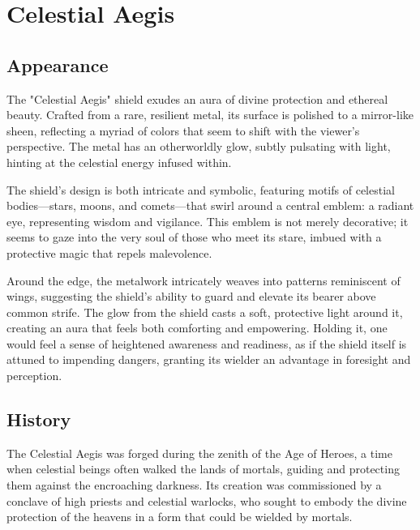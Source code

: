 
\chapter*{Celestial Aegis}

\section*{Appearance}
The "Celestial Aegis" shield exudes an aura of divine protection and ethereal beauty. Crafted from a rare, resilient metal, its surface is polished to a mirror-like sheen, reflecting a myriad of colors that seem to shift with the viewer's perspective. The metal has an otherworldly glow, subtly pulsating with light, hinting at the celestial energy infused within.

The shield's design is both intricate and symbolic, featuring motifs of celestial bodies—stars, moons, and comets—that swirl around a central emblem: a radiant eye, representing wisdom and vigilance. This emblem is not merely decorative; it seems to gaze into the very soul of those who meet its stare, imbued with a protective magic that repels malevolence.

Around the edge, the metalwork intricately weaves into patterns reminiscent of wings, suggesting the shield's ability to guard and elevate its bearer above common strife. The glow from the shield casts a soft, protective light around it, creating an aura that feels both comforting and empowering. Holding it, one would feel a sense of heightened awareness and readiness, as if the shield itself is attuned to impending dangers, granting its wielder an advantage in foresight and perception.

\section*{History}
The Celestial Aegis was forged during the zenith of the Age of Heroes, a time when celestial beings often walked the lands of mortals, guiding and protecting them against the encroaching darkness. Its creation was commissioned by a conclave of high priests and celestial warlocks, who sought to embody the divine protection of the heavens in a form that could be wielded by mortals.

